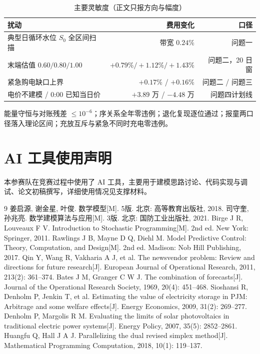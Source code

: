 \documentclass[12pt,a4paper]{ctexart}
\begin{document}
\begin{table}[H]
\centering\small
\caption{主要灵敏度（正文只报方向与幅度）}
\begin{tabular}{lrr}
\toprule
扰动 & 费用变化 & 口径 \\
\midrule
典型日循环水位 $S_0$ 全区间扫描 & 带宽 $0.24\%$ & 问题一 \\
末端估值 $0.60/0.80/1.00$ & $+0.79\%/+1.12\%/+1.43\%$ & 问题二，20 日窗 \\
紧急购电缺口上界 & $+0.17\%$ / $+0.16\%$ & 问题二 / 问题三 \\
电价不建模 / 0:00 已知当日价 & $+3.89$ 万 / $-4.48$ 万 & 问题四计划线 \\
\bottomrule
\end{tabular}
\label{tab:sens}
\end{table}

能量守恒与对账残差 $\le10^{-6}$；序关系全年零违例；退化复现逐位通过；报童两口径落入理论区间；充放互斥与紧急不同时充电零违例。

\label{page:bodyend}

\section*{AI 工具使用声明}
本参赛队在竞赛过程中使用了 AI 工具，主要用于建模思路讨论、代码实现与调试、论文初稿撰写，详细使用情况见支撑材料。

\begin{thebibliography}{9}\small
{} 姜启源, 谢金星, 叶俊. 数学模型[M]. 5版. 北京: 高等教育出版社, 2018.
 司守奎, 孙兆亮. 数学建模算法与应用[M]. 3版. 北京: 国防工业出版社, 2021.
 Birge J R, Louveaux F V. Introduction to Stochastic Programming[M]. 2nd ed. New York: Springer, 2011.
 Rawlings J B, Mayne D Q, Diehl M. Model Predictive Control: Theory, Computation, and Design[M]. 2nd ed. Madison: Nob Hill Publishing, 2017.
 Qin Y, Wang R, Vakharia A J, et al. The newsvendor problem: Review and directions for future research[J]. European Journal of Operational Research, 2011, 213(2): 361--374.
 Bates J M, Granger C W J. The combination of forecasts[J]. Journal of the Operational Research Society, 1969, 20(4): 451--468.
 Sioshansi R, Denholm P, Jenkin T, et al. Estimating the value of electricity storage in PJM: Arbitrage and some welfare effects[J]. Energy Economics, 2009, 31(2): 269--277.
 Denholm P, Margolis R M. Evaluating the limits of solar photovoltaics in traditional electric power systems[J]. Energy Policy, 2007, 35(5): 2852--2861.
 Huangfu Q, Hall J A J. Parallelizing the dual revised simplex method[J]. Mathematical Programming Computation, 2018, 10(1): 119--137.
\end{thebibliography}
\end{document}
